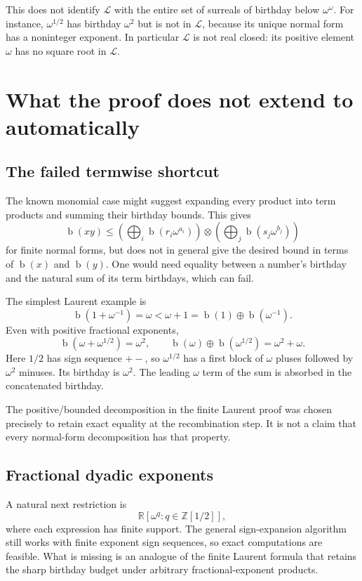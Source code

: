 \documentclass[11pt,letterpaper]{article}
\numberwithin{equation}{section}
\theoremstyle{definition}
\theoremstyle{remark}
\newcommand{\R}{\mathbb{R}}
\newcommand{\D}{\mathbb{Z}[1/2]}
\newcommand{\Lau}{\mathcal{L}}
\newcommand{\bd}{\operatorname{b}}
\newcommand{\ns}{\mathbin{\oplus}}
\newcommand{\np}{\mathbin{\otimes}}
\newcommand{\bigns}{\mathop{\bigoplus}}
\begin{document}
This does not identify $\Lau$ with the entire set of surreals of birthday
below $\omega^\omega$. For instance, $\omega^{1/2}$ has birthday $\omega^2$
but is not in $\Lau$, because its unique normal form has a noninteger exponent.
In particular $\Lau$ is not real closed: its positive element $\omega$ has no
square root in $\Lau$.

\section{What the proof does not extend to automatically}
\label{sec:limits}
\subsection{The failed termwise shortcut}
The known monomial case might suggest expanding every product into term
products and summing their birthday bounds. This gives
\[
 \bd(xy)\leq
 \left(\bigns_i\bd(r_i\omega^{a_i})\right)
 \np
 \left(\bigns_j\bd(s_j\omega^{b_j})\right)
\]
for finite normal forms, but does not in general give the desired bound in
terms of $\bd(x)$ and $\bd(y)$. One would need equality between a number's
birthday and the natural sum of its term birthdays, which can fail.

The simplest Laurent example is
\[
 \bd(1+\omega^{-1})=\omega
 <\omega+1=\bd(1)\ns\bd(\omega^{-1}).
\]
Even with positive fractional exponents,
\[
 \bd(\omega+\omega^{1/2})=\omega^2,
 \qquad
 \bd(\omega)\ns\bd(\omega^{1/2})=\omega^2+\omega.
\]
Here $1/2$ has sign sequence $+-$, so $\omega^{1/2}$ has a first block of
$\omega$ pluses followed by $\omega^2$ minuses. Its birthday is $\omega^2$.
The leading $\omega$ term of the sum is absorbed in the concatenated birthday.

The positive/bounded decomposition in the finite Laurent proof was chosen
precisely to retain exact equality at the recombination step. It is not a
claim that every normal-form decomposition has that property.

\subsection{Fractional dyadic exponents}
A natural next restriction is
\[
 \R[\omega^q:q\in\D],
\]
where each expression has finite support. The general sign-expansion algorithm
still works with finite exponent sign sequences, so exact computations are
feasible. What is missing is an analogue of the finite Laurent formula that
retains the sharp birthday budget under arbitrary fractional-exponent
products.
\end{document}
